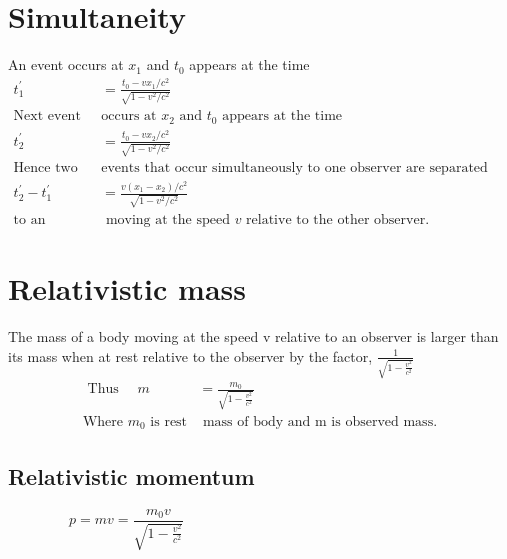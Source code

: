 \section{ Simultaneity}
An event occurs at $x_{1}$ and $t_{0}$ appears at the time 
\begin{align*}
t_{1}^{\prime}&=\frac{t_{0}-v x_{1} / c^{2}}{\sqrt{1-v^{2} / c^{2}}}\\
\text{Next event }&\text{occurs at  $x_{2}$ and $t_{0}$ appears at the time}\\
t_{2}^{\prime}&=\frac{t_{0}-v x_{2} / c^{2}}{\sqrt{1-v^{2} / c^{2}}}\\
\text{Hence two }&\text{events that occur simultaneously to one observer are separated by a time interval of}\\
t_{2}^{\prime}-t_{1}^{\prime}&=\frac{v\left(x_{1}-x_{2}\right) / c^{2}}{\sqrt{1-v^{2} / c^{2}}}\\
\text{to an observer}&\text{ moving at the speed $v$ relative to the other observer.}
\end{align*}
\section{Relativistic mass}
The mass of a body moving at the speed v relative to an observer is larger than its mass when at rest relative to the observer by the factor, $\frac{1}{\sqrt{1-\frac{v^{2}}{c^{2}}}}$
\begin{align*}
\text { Thus } \quad m&=\frac{m_{0}}{\sqrt{1-\frac{v^{2}}{c^{2}}}}\\
\text{Where $m_{0}$ is rest}&\text{ mass of body and $\mathrm{m}$ is observed mass.}
\end{align*}
\subsection{Relativistic momentum}
$$
p=m v=\frac{m_{0} v}{\sqrt{1-\frac{v^{2}}{c^{2}}}}\hspace{8cm}
$$
